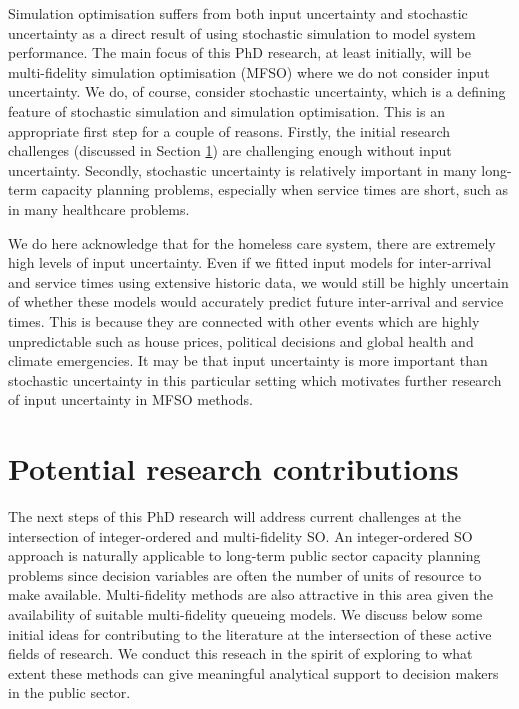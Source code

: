 \documentclass[12pt,a4paper]{article}
\begin{document}
Simulation optimisation suffers from both input uncertainty and stochastic uncertainty as a direct result of using stochastic simulation to model system performance. The main focus of this PhD research, at least initially, will be multi-fidelity simulation optimisation (MFSO) where we do not consider input uncertainty. We do, of course, consider stochastic uncertainty, which is a defining feature of stochastic simulation and simulation optimisation. This is an appropriate first step for a couple of reasons. Firstly, the initial research challenges (discussed in Section \ref{mfso}) are challenging enough without input uncertainty. Secondly, stochastic uncertainty is relatively important in many long-term capacity planning problems, especially when service times are short, such as in many healthcare problems. 

We do here acknowledge that for the homeless care system, there are extremely high levels of input uncertainty. Even if we fitted input models for inter-arrival and service times using extensive historic data, we would still be highly uncertain of whether these models would accurately predict future inter-arrival and service times. This is because they are connected with other events which are highly unpredictable such as house prices, political decisions and global health and climate emergencies. It may be that input uncertainty is more important than stochastic uncertainty in this particular setting which motivates further research of input uncertainty in MFSO methods. 

\newpage

\section{Potential research contributions} \label{mfso}

The next steps of this PhD research will address current challenges at the intersection of integer-ordered and multi-fidelity SO. An integer-ordered SO approach is naturally applicable to long-term public sector capacity planning problems since decision variables are often the number of units of resource to make available. Multi-fidelity methods are also attractive in this area given the availability of suitable multi-fidelity queueing models. We discuss below some initial ideas for contributing to the literature at the intersection of these active fields of research. We conduct this reseach in the spirit of exploring to what extent these methods can give meaningful analytical support to decision makers in the public sector.
\end{document}
